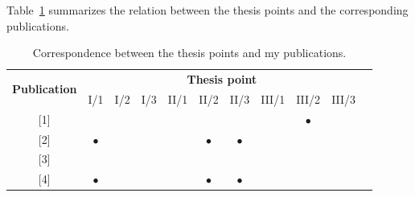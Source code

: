 \documentclass{article}
\begin{document}
\vspace*{1em}
\noindent
Table~\ref{tab:summary_table} summarizes the relation between the thesis points and the corresponding publications.
\vspace*{2em}

\begin{table}[h!]
\centering
\caption{Correspondence between the thesis points and my publications.}
\label{tab:summary_table}
\begin{tabular}{|c|c|c|c|c|c|c|c|c|c|c|}
\hline
\multirow{2}{*}{\textbf{Publication}} & \multicolumn{9}{c|}{\textbf{Thesis point}}                                                                                                                                                                                                                                        \\
                                      & \multicolumn{1}{c|}{I/1}       & \multicolumn{1}{c|}{I/2}       & \multicolumn{1}{c|}{I/3}       & \multicolumn{1}{c|}{II/1}      & \multicolumn{1}{c|}{II/2}      & \multicolumn{1}{c|}{II/3}      & \multicolumn{1}{c|}{III/1}     & \multicolumn{1}{c|}{III/2}     & III/3     \\ \hline
{[}1{]}                               & \multicolumn{1}{c|}{}          & \multicolumn{1}{c|}{}          & \multicolumn{1}{c|}{}          & \multicolumn{1}{c|}{}          & \multicolumn{1}{c|}{}          & \multicolumn{1}{c|}{}          & \multicolumn{1}{c|}{}          & \multicolumn{1}{c|}{$\bullet$} &           \\ \hline
{[}2{]}                               & \multicolumn{1}{c|}{$\bullet$} & \multicolumn{1}{c|}{}          & \multicolumn{1}{c|}{}          & \multicolumn{1}{c|}{}          & \multicolumn{1}{c|}{$\bullet$} & \multicolumn{1}{c|}{$\bullet$} & \multicolumn{1}{c|}{}          & \multicolumn{1}{c|}{}          &           \\ \hline
{[}3{]}                               & \multicolumn{1}{c|}{}          & \multicolumn{1}{c|}{}          & \multicolumn{1}{c|}{}          & \multicolumn{1}{c|}{}          & \multicolumn{1}{c|}{}          & \multicolumn{1}{c|}{}          & \multicolumn{1}{c|}{}          & \multicolumn{1}{c|}{}          &           \\ \hline
{[}4{]}                               & \multicolumn{1}{c|}{$\bullet$} & \multicolumn{1}{c|}{}          & \multicolumn{1}{c|}{}          & \multicolumn{1}{c|}{}          & \multicolumn{1}{c|}{$\bullet$} & \multicolumn{1}{c|}{$\bullet$} & \multicolumn{1}{c|}{}          & \multicolumn{1}{c|}{}          &           \\ \hline

\end{tabular}
\end{table}
\end{document}
